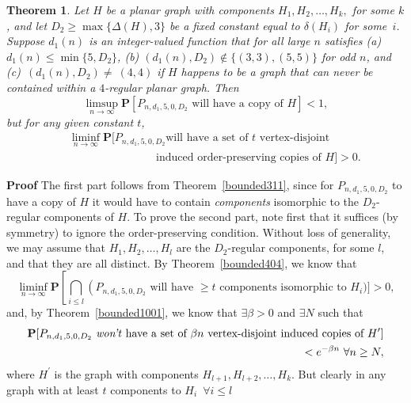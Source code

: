 \documentclass{article}
\newtheorem{Theorem}{Theorem}
\newtheorem{Proof of Theorem}{Proof of Theorem}
\begin{document}
\begin{Theorem} \label{bounded1002}
Let $H$ be a planar graph with components $H_{1}, H_{2}, \ldots, H_{k},$ for some $k$,
and let $D_{2} \geq \max \{ \Delta(H),3 \}$ be a fixed constant equal to $\delta(H_{i})$ for some~$i$.
Suppose $d_{1}(n)$ is an integer-valued function that for all large $n$ satisfies
(a) $d_{1}(n) \leq \min \{ 5,D_{2} \}$,
(b) $(d_{1}(n),D_{2}) \notin \{ (3,3),(5,5) \}$ for odd $n$,
and (c)~$\!(d_{1}(n), D_{2}) \neq~\!(4,4)$ 
if $H$ happens to be a graph that can never be contained within a $4$-regular planar graph.
Then
\begin{displaymath}
\limsup_{n \to \infty} \mathbf{P} [P_{n,d_{1},5,0,D_{2}}
\textrm{ will have a copy of $H$}] < 1,
\end{displaymath}
but for any given constant $t$,
\begin{eqnarray*}
& & \liminf_{n \to \infty} \mathbf{P} \Big[
\textrm{$P_{n,d_{1},5,0,D_{2}}$
will have a set of $t$ vertex-disjoint} \\
& & \phantom{wwwwwwwwwww}\textrm{induced order-preserving copies of $H$}\Big]
>0.
\end{eqnarray*}
\end{Theorem} 
\textbf{Proof}
The first part follows from Theorem~\ref{bounded311},
since for $P_{n,d_{1},5,0,D_{2}}$ to have a copy of $H$
it would have to contain \textit{components} isomorphic to the $D_{2}$-regular components of $H$. 
To prove the second part,
note first that it suffices (by symmetry) to ignore the order-preserving condition.
Without loss of generality,
we may assume that $H_{1},H_{2}, \ldots, H_{l}$
are the $D_{2}$-regular components, for some $l$,
and that they are all distinct.
By Theorem~\ref{bounded404},
we know that
\begin{displaymath}
\liminf_{n \to \infty}
\textrm{$\mathbf{P}\left[ \bigcap_{i \leq l} \left(P_{n,d_{1},5,0,D_{2}} \right.\right.$ 
will have $\geq t$ components isomorphic to $H_{i}$} ) \Big] > 0,
\end{displaymath}
and, by Theorem~\ref{bounded1001},
we know that $\exists \beta > 0$ and $\exists N$ such that
\begin{eqnarray*}
\mathbf{P} [
\textrm{$P_{n,d_{1},5,0,D_{2}}$
\textit{won't} have a set of $\beta n$ vertex-disjoint induced copies of $H^{\prime}$}] \\
< e^{- \beta n} \textrm{ } \forall n \geq N,
\end{eqnarray*}
where $H^{\prime}$ is the graph with components $H_{l+1},H_{l+2}, \ldots, H_{k}$.
But clearly in any graph with at least $t$ components to $H_{i}$~$\forall i \leq l$
\end{document}
